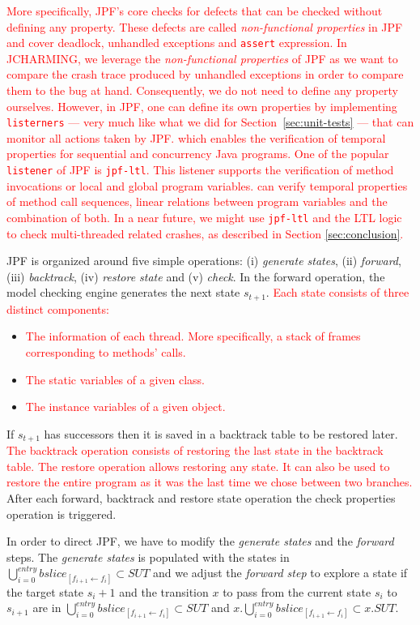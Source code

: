 \documentclass[times, doublespace]{smrauth}
\newcommand{\red}[1]{\textcolor{red}{#1}}
\begin{document}
{\red{More specifically, JPF's core checks for defects that can be checked without defining any property.
These defects are called \textit{non-functional properties} in JPF and cover deadlock, unhandled exceptions and \texttt{assert} expression.
In JCHARMING, we leverage the \textit{non-functional properties} of JPF as we want to compare the crash trace produced by unhandled exceptions in order to compare them to the bug at hand.
Consequently, we do not need to define any property ourselves.
However, in JPF, one can define its own properties by implementing \texttt{listerners} --- very much like what we did for Section~\ref{sec:unit-tests} --- that can monitor all actions taken by JPF. which enables the verification of temporal properties for sequential and concurrency Java programs.
One of the popular \texttt{listener} of JPF is \texttt{jpf-ltl}.
This listener supports the verification of method invocations or local and global program variables. \textttt{jpf-ltl} can verify temporal properties of method call sequences, linear relations between program variables and the combination of both.
In a near future, we might use \texttt{jpf-ltl} and the LTL logic to check multi-threaded related crashes, as described in Section \ref{sec:conclusion}.}

JPF is organized around five simple
operations: (i) {\it generate states}, (ii) {\it forward}, (iii) {\it backtrack},
(iv) {\it restore state} and (v) {\it check}.
In the forward operation, the
model checking engine generates the next state $s_{t+1}$.
\red{Each state consists of three distinct components: }
\begin{itemize}
  \item \red{The information of each thread. More specifically, a stack of frames corresponding to methods' calls.}
  \item \red{The static variables of a given class.}
  \item \red{The instance variables of a given object.}
\end{itemize}
If $s_{t+1}$ has successors then it is saved in a backtrack table to be
restored later. \red{The backtrack operation consists of restoring
the last state in the backtrack table. The restore operation
allows restoring any state. It can also be used to restore the entire
program as it was the last time we chose between two
branches.} After each forward, backtrack and restore state
operation the check properties operation is triggered.

In order to direct JPF, we have to modify the {\it generate states}
and the {\it forward} steps. The {\it generate states} is populated with
the states in $\bigcup_{i=0}^{entry} bslice_{[f_{i+1} \leftarrow f_i]}  \subset SUT$ and we adjust the
{\it forward step} to explore a state if the target state $s_i+1$ and the
transition $x$ to pass from the current state $s_i$ to $s_{i+1}$ are in
$\bigcup_{i=0}^{entry} bslice_{[f_{i+1} \leftarrow f_i]}  \subset SUT$ and $x.\bigcup_{i=0}^{entry} bslice_{[f_{i+1} \leftarrow f_i]}  \subset x.SUT$.

}
\end{document}
